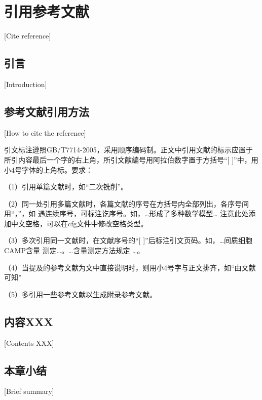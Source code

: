 
\chapter{引用参考文献}[Cite reference]

\section{引言}[Introduction]

\lipsum[1]

\section{参考文献引用方法}[How to cite the reference]

引文标注遵照GB/T7714-2005，采用顺序编码制。正文中引用文献的标示应置于所引内容最后一个字的右上角，所引文献编号用阿拉伯数字置于方括号“[ ]”中，用小4号字体的上角标。要求：

（1）引用单篇文献时，如“二次铣削\cite{ren2010}”。

（2）同一处引用多篇文献时，各篇文献的序号在方括号内全部列出，各序号间用“，”，如
遇连续序号，可标注讫序号。如，…形成了多种数学模型\cite{Gravagne2003,ren2010}…
注意此处添加中文空格，可以在cfg文件中修改空格类型。

（3）多次引用同一文献时，在文献序号的“[ ]”后标注引文页码。如，…间质细胞CAMP含量
测定\cite[100-197]{Gravagne2003}…。…含量测定方法规定
\cite[92]{Gravagne2003}…。

（4）当提及的参考文献为文中直接说明时，则用小4号字与正文排齐，如“由文献可知”

（5）多\cite{liu2016}引\cite{fu2018}用\cite{zhai2015}一\cite{yao2015}些\cite{jones2006}参\cite{mcmahan2005}考\cite{jones2004}文献以生成附录参考文献。

\section{内容XXX}[Contents XXX]

\lipsum[3]

\section{本章小结}[Brief summary]

\lipsum[1]
